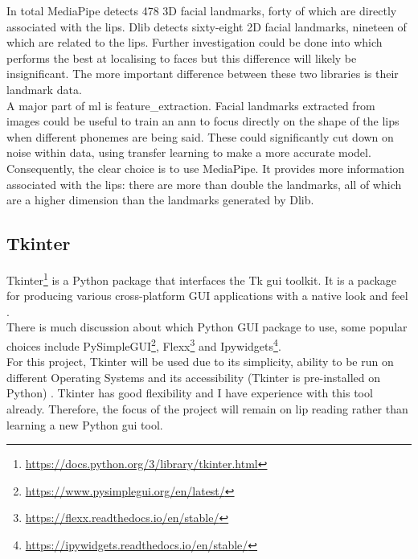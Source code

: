 In total MediaPipe detects 478 3D facial landmarks, forty of which are directly associated with the lips. Dlib detects sixty-eight 2D facial landmarks, nineteen of which are related to the lips. Further investigation could be done into which performs the best at localising to faces but this difference will likely be insignificant. The more important difference between these two libraries is their landmark data.\\
A major part of \acrshort{ml} is \gls{feature_extraction}. Facial landmarks extracted from images could be useful to train an \acrshort{ann} to focus directly on the shape of the lips when different \gls{phoneme}s are being said. These could significantly cut down on noise within data, using transfer learning to make a more accurate model.\\
Consequently, the clear choice is to use MediaPipe. It provides more information associated with the lips: there are more than double the landmarks, all of which are a higher dimension than the landmarks generated by Dlib.
\subsection{Tkinter}
Tkinter\footnote{\url{https://docs.python.org/3/library/tkinter.html}} is a Python package that interfaces the Tk \acrfull{gui} toolkit. It is a package for producing various cross-platform GUI applications with a native look and feel \cite{An-introduction-to-tkinter}.\\
There is much discussion about which Python GUI package to use, some popular choices include PySimpleGUI\footnote{\url{https://www.pysimplegui.org/en/latest/}}, Flexx\footnote{\url{https://flexx.readthedocs.io/en/stable/}} and Ipywidgets\footnote{\url{https://ipywidgets.readthedocs.io/en/stable/}}.\\
For this project, Tkinter will be used due to its simplicity, ability to be run on different Operating Systems and its accessibility (Tkinter is pre-installed on Python) \cite{comparing_python_guis}. Tkinter has good flexibility and I have experience with this tool already. Therefore, the focus of the project will remain on lip reading rather than learning a new Python \acrshort{gui} tool.
